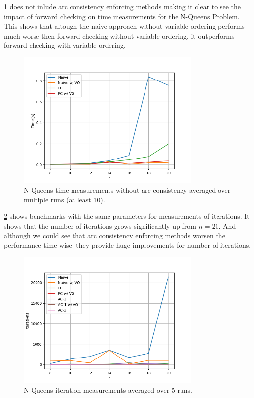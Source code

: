 \cref{fig:queens:time-no-arc} does not inlude arc consistency enforcing methods making it clear to see the impact of forward checking on time measurements for the N-Queens Problem. This shows that altough the naive approach without variable ordering performs much worse then forward checking without variable ordering, it outperforms forward checking with variable ordering.

\begin{figure}[ht]
	\centering
	\includegraphics[width=0.8\textwidth]{./Problems/queens/plots/time_no_arc.png}
	\caption{N-Queens time measurements without arc consistency averaged over multiple runs (at least 10).}
	\label{fig:queens:time-no-arc}
\end{figure}

\cref{fig:queens:iterations} shows benchmarks with the same parameters for measurements of iterations. It shows that the number of iterations grows significantly up from $n = 20$. And although we could see that arc consistency enforcing methods worsen the performance time wise, they provide huge improvements for number of iterations.

\begin{figure}[ht]
	\centering
	\includegraphics[width=0.8\textwidth]{./Problems/queens/plots/iterations.png}
	\caption{N-Queens iteration measurements averaged over 5 runs.}
	\label{fig:queens:iterations}
\end{figure}

